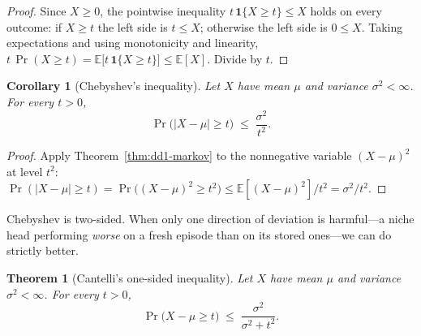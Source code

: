 \documentclass[11pt,a4paper]{article}
\theoremstyle{definition}
\theoremstyle{plain}
\newtheorem{theorem}{Theorem}[section]
\newtheorem{corollary}{Corollary}[section]
\newcommand{\E}{\mathbb{E}}
\begin{document}
\begin{proof}
Since $X \ge 0$, the pointwise inequality
$t\,\mathbf{1}\{X \ge t\} \le X$ holds on every outcome: if $X \ge t$ the left
side is $t \le X$; otherwise the left side is $0 \le X$. Taking expectations
and using monotonicity and linearity,
$t\,\Pr(X \ge t) = \E\bigl[t\,\mathbf{1}\{X \ge t\}\bigr] \le \E[X]$.
Divide by $t$.
\end{proof}

\begin{corollary}[Chebyshev's inequality]
\label{cor:dd1-chebyshev}
Let $X$ have mean $\mu$ and variance $\sigma^2 < \infty$. For every $t > 0$,
\begin{equation}
\label{eq:dd1-chebyshev}
\Pr\bigl( |X - \mu| \ge t \bigr) \;\le\; \frac{\sigma^2}{t^2}.
\end{equation}
\end{corollary}

\begin{proof}
Apply Theorem~\ref{thm:dd1-markov} to the nonnegative variable
$(X - \mu)^2$ at level $t^2$:
$\Pr(|X - \mu| \ge t) = \Pr\bigl((X - \mu)^2 \ge t^2\bigr)
\le \E[(X-\mu)^2] / t^2 = \sigma^2 / t^2$.
\end{proof}

Chebyshev is two-sided. When only one direction of deviation is harmful---a
niche head performing \emph{worse} on a fresh episode than on its stored
ones---we can do strictly better.

\begin{theorem}[Cantelli's one-sided inequality]
\label{thm:dd1-cantelli}
Let $X$ have mean $\mu$ and variance $\sigma^2 < \infty$. For every $t > 0$,
\begin{equation}
\label{eq:dd1-cantelli}
\Pr\bigl( X - \mu \ge t \bigr) \;\le\; \frac{\sigma^2}{\sigma^2 + t^2}.
\end{equation}
\end{theorem}
\end{document}
